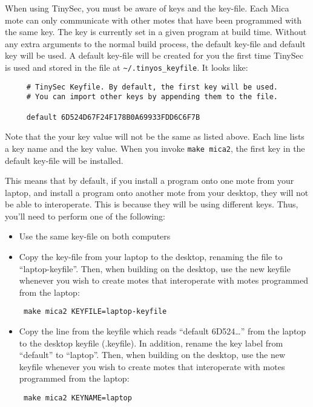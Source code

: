 \documentclass[11pt]{article}
\begin{document}
When using TinySec, you must be aware of keys and the key-file.  Each Mica mote
can only communicate with other motes that have been programmed with the same
key. The key is currently set in a given program at build time. Without any
extra arguments to the normal build process, the default key-file and default
key will be used. A default key-file will be created for you the first time
TinySec is used and stored in the file at {\tt  \~\//.tinyos\_keyfile}. 
It looks like:

\begin{verbatim}
     # TinySec Keyfile. By default, the first key will be used.
     # You can import other keys by appending them to the file.

     default 6D524D67F24F178B0A69933FDD6C6F7B
\end{verbatim}

Note that the your key value will not be the same as listed above. Each line
lists a key name and the key value. When you invoke {\tt make mica2}, the first
key in the default key-file will be installed. 

This means that by default, if you install a program onto one mote from your
laptop, and install a program onto another mote from your desktop, they will
not be able to interoperate. This is because they will be using different
keys. Thus, you'll need to perform one of the following:
\begin{itemize}
   \item Use the same key-file on both computers
   \item Copy the key-file from your laptop to the desktop, renaming the file
     to ``laptop-keyfile''. Then, when building on the desktop, use the new
     keyfile whenever you wish to create motes that interoperate with motes
     programmed from the laptop:
     \begin{verbatim} make mica2 KEYFILE=laptop-keyfile \end{verbatim}
  \item Copy the line from the keyfile which reads ``default 6D524\ldots'' from the laptop to the desktop
     keyfile (.keyfile). In addition, rename the key label from ``default'' to
    ``laptop''.  Then, when building on the desktop, use the new keyfile
     whenever you wish to create motes that interoperate with motes programmed
     from the laptop:
     \begin{verbatim} make mica2 KEYNAME=laptop \end{verbatim}
\end{itemize}
\end{document}
